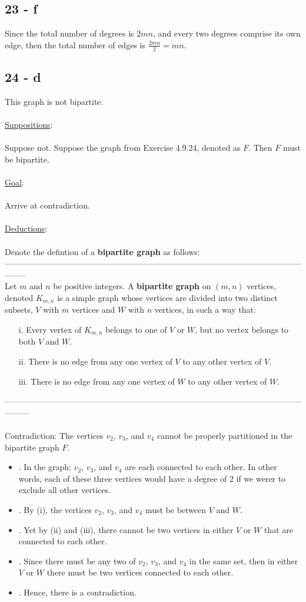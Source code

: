 \documentclass[12pt]{article}
\newcommand{\xlist}[1]{
    \begin{itemize}
        \renewcommand{\labelitemi}{$\centerdot$}
        #1
    \end{itemize}
    \newblock
}
\newcommand{\xsupposition}{
    \underline{Suppositions}:
    \\ \\
}
\newcommand{\xgoal}{
    \underline{Goal}:
    \\ \\
}
\newcommand{\xdeduction}{
    \underline{Deductions}:
    \\ \\
}
\begin{document}
\subsection*{23 - f}
Since the total number of degrees is $2mn$, and every two degrees comprise its own edge, then the total number of edges is $\frac{2mn}{2} = mn$.
\newpage
\subsection*{24 - d}
This graph is not bipartite.
\\ \\
\xsupposition
Suppose not. Suppose the graph from Exercise 4.9.24, denoted as $F$. Then $F$ must be bipartite.
\\ \\
\xgoal
Arrive at contradiction.
\\ \\
\xdeduction
Denote the defintion of a \textbf{bipartite graph} as follows: 
\\
-------------------------------------------------------------------------------------------------------------------- \\
Let $m$ and $n$ be positive integers. A \textbf{bipartite graph} on $(m, n)$ vertices, denoted $K_{m,n}$ is a simple graph whose vertices are divided into two distinct subsets, $V$ with $m$ vertices and $W$ with $n$ vertices, in such a way that:
\begin{itemize}
  \item [i.] Every vertex of $K_{m,n}$ belongs to one of $V$ or $W$, but no vertex belongs to both $V$ and $W$.
  \item [ii.] There is no edge from any one vertex of $V$ to any other vertex of $V$.
  \item [iii.] There is no edge from any one vertex of $W$ to any other vertex of $W$.
\end{itemize}
\newblock
---------------------------------------------------------------------------------------------------------------------
\\ \\
Contradiction: The vertices $v_2$, $v_3$, and $v_4$ cannot be properly partitioned in the bipartite graph $F$.
\xlist{
  \item [.] In the graph; $v_2$, $v_3$, and $v_4$ are each connected to each other. In other words, each of these three vertices would have a degree of 2 if we werer to exclude all other vertices.
  \item [.] By (i), the vertices $v_2$, $v_3$, and $v_4$ must be between $V$ and $W$.
  \item [.] Yet by (ii) and (iii), there cannot be two vertices in either $V$ or $W$ that are connected to each other.
  \item [.] Since there must be any two of $v_2$, $v_3$, and $v_4$ in the same set, then in either $V$ or $W$ there must be two vertices connected to each other.
  \item [.] Hence, there is a contradiction.
}
\end{document}
